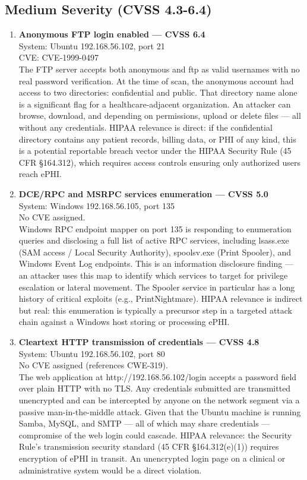 \documentclass[12pt]{article}
\begin{document}
\subsection{Medium Severity (CVSS 4.3-6.4)}
\begin{enumerate}
	\item \textbf{Anonymous FTP login enabled — CVSS 6.4}\\
		System: Ubuntu 192.168.56.102, port 21\\
		CVE: CVE-1999-0497\\
		The FTP server accepts both anonymous and ftp as valid usernames with no real password verification. At the time of scan, the anonymous account had access to two directories: confidential and public. That directory name alone is a significant flag for a healthcare-adjacent organization. An attacker can browse, download, and depending on permissions, upload or delete files — all without any credentials. HIPAA relevance is direct: if the confidential directory contains any patient records, billing data, or PHI of any kind, this is a potential reportable breach vector under the HIPAA Security Rule (45 CFR §164.312), which requires access controls ensuring only authorized users reach ePHI.
	\item \textbf{DCE/RPC and MSRPC services enumeration — CVSS 5.0}\\
		System: Windows 192.168.56.105, port 135\\
		No CVE assigned.\\
		Windows RPC endpoint mapper on port 135 is responding to enumeration queries and disclosing a full list of active RPC services, including lsass.exe (SAM access / Local Security Authority), spoolsv.exe (Print Spooler), and Windows Event Log endpoints. This is an information disclosure finding — an attacker uses this map to identify which services to target for privilege escalation or lateral movement. The Spooler service in particular has a long history of critical exploits (e.g., PrintNightmare). HIPAA relevance is indirect but real: this enumeration is typically a precursor step in a targeted attack chain against a Windows host storing or processing ePHI.
	\item \textbf{Cleartext HTTP transmission of credentials — CVSS 4.8}\\
		System: Ubuntu 192.168.56.102, port 80\\
		No CVE assigned (references CWE-319).\\
		The web application at http://192.168.56.102/login accepts a password field over plain HTTP with no TLS. Any credentials submitted are transmitted unencrypted and can be intercepted by anyone on the network segment via a passive man-in-the-middle attack. Given that the Ubuntu machine is running Samba, MySQL, and SMTP — all of which may share credentials — compromise of the web login could cascade. HIPAA relevance: the Security Rule's transmission security standard (45 CFR §164.312(e)(1)) requires encryption of ePHI in transit. An unencrypted login page on a clinical or administrative system would be a direct violation.

\end{enumerate}
\end{document}
